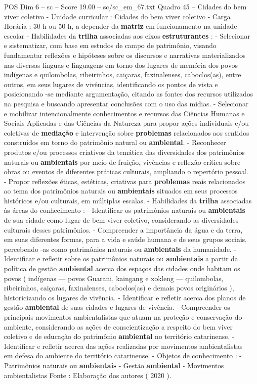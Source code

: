 \begin{textsample}{POS Dim 6 – sc – Score 19.00 – sc/sc\_em\_67.txt}
Quadro 45 – Cidades do bem viver coletivo - Unidade curricular : Cidades do bem viver coletivo - Carga Horária : 30 h ou 50 h, a depender da \textbf{matriz} em funcionamento na unidade escolar - Habilidades da \textbf{trilha} associadas aos eixos \textbf{estruturantes} : - Selecionar e sistematizar, com base em estudos de campo de patrimônio, visando fundamentar reflexões e hipóteses sobre os discursos e narrativas materializados nas diversas línguas e linguagens em torno dos lugares de memória dos povos indígenas e quilombolas, ribeirinhos, caiçaras, faxinalenses, caboclos(as), entre outros, em seus lugares de vivências, identificando os pontos de vista e posicionando -se mediante argumentação, citando as fontes dos recursos utilizados na pesquisa e buscando apresentar conclusões com o uso das mídias. - Selecionar e mobilizar intencionalmente conhecimentos e recursos das Ciências Humanas e Sociais Aplicadas e das Ciências da Natureza para propor ações individuais e/ou coletivas de \textbf{mediação} e intervenção sobre \textbf{problemas} relacionados aos sentidos construídos em torno do patrimônio natural ou \textbf{ambiental}. - Reconhecer produtos e/ou processos criativos da temática das diversidades dos patrimônios naturais ou \textbf{ambientais} por meio de fruição, vivências e reflexão crítica sobre obras ou eventos de diferentes práticas culturais, ampliando o repertório pessoal. - Propor reflexões éticas, estéticas, criativas para \textbf{problemas} reais relacionados ao tema dos patrimônios naturais ou \textbf{ambientais} situados em seus processos históricos e/ou culturais, em múltiplas escalas. - Habilidades da \textbf{trilha} associadas às áreas do conhecimento : - Identificar os patrimônios naturais ou \textbf{ambientais} de sua cidade como lugar de bem viver coletivo, considerando as diversidades culturais desses patrimônios. - Compreender a importância da água e da terra, em suas diferentes formas, para a vida e saúde humana e de seus grupos sociais, percebendo -as como patrimônios naturais ou \textbf{ambientais} da humanidade. - Identificar e refletir sobre os patrimônios naturais ou \textbf{ambientais} a partir da política de gestão \textbf{ambiental} acerca dos espaços das cidades onde habitam os povos ( indígenas — povos Guarani, kaingang e xokleng — quilombolas, ribeirinhos, caiçaras, faxinalenses, caboclos(as) e demais povos originários ), historicizando os lugares de vivência. - Identificar e refletir acerca dos planos de gestão \textbf{ambiental} de suas cidades e lugares de vivência. - Compreender os principais movimentos ambientalistas que atuam na proteção e conservação do ambiente, considerando as ações de conscientização a respeito do bem viver coletivo e de educação do patrimônio \textbf{ambiental} no território catarinense. - Identificar e refletir acerca das ações realizadas por movimentos ambientalistas em defesa do ambiente do território catarinense. - Objetos de conhecimento : - Patrimônios naturais ou \textbf{ambientais} - Gestão \textbf{ambiental} - Movimentos ambientalistas Fonte : Elaboração dos autores ( 2020 ).

\end{textsample}
